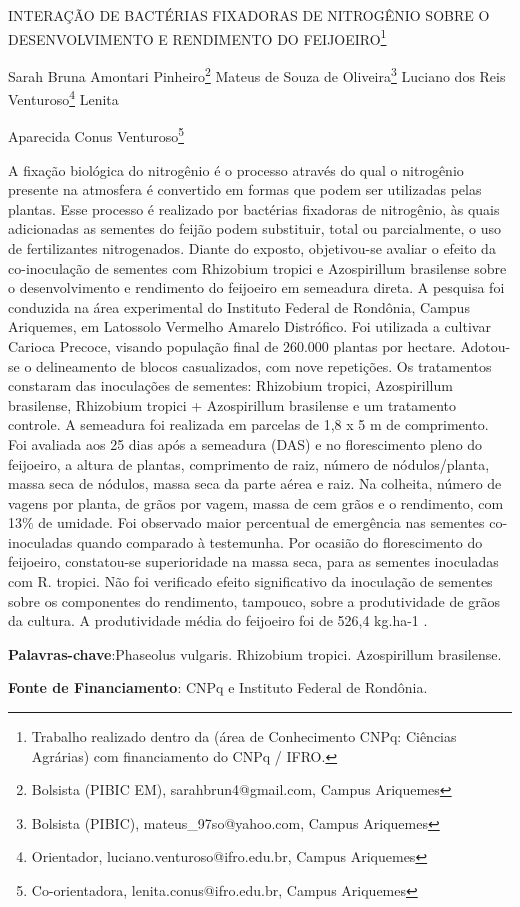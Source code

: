 \documentclass[article,12pt,onesidea,4paper,english,brazil]{abntex2}
\begin{document}
	
	
	\frenchspacing 
	
	\begin{center}
		\LARGE INTERAÇÃO DE BACTÉRIAS FIXADORAS DE NITROGÊNIO SOBRE O
		DESENVOLVIMENTO E RENDIMENTO DO FEIJOEIRO\footnote{Trabalho realizado dentro da (área de Conhecimento CNPq: Ciências Agrárias) com financiamento
			do CNPq / IFRO.}
		
		\normalsize
		Sarah Bruna Amontari Pinheiro\footnote{Bolsista (PIBIC EM), sarahbrun4@gmail.com, Campus Ariquemes} 
		Mateus de Souza de Oliveira\footnote{Bolsista (PIBIC), mateus\_97so@yahoo.com, Campus Ariquemes} 
		Luciano dos Reis Venturoso\footnote{Orientador, luciano.venturoso@ifro.edu.br, Campus Ariquemes} 
		Lenita
		
		Aparecida Conus Venturoso\footnote{Co-orientadora, lenita.conus@ifro.edu.br, Campus Ariquemes} 
	
        
    \end{center}    
	
	\noindent A fixação biológica do nitrogênio é o processo através do qual o nitrogênio presente
	na atmosfera é convertido em formas que podem ser utilizadas pelas plantas. Esse
	processo é realizado por bactérias fixadoras de nitrogênio, às quais adicionadas as
	sementes do feijão podem substituir, total ou parcialmente, o uso de fertilizantes
	nitrogenados. Diante do exposto, objetivou-se avaliar o efeito da co-inoculação de
	sementes com Rhizobium tropici e Azospirillum brasilense sobre o desenvolvimento
	e rendimento do feijoeiro em semeadura direta. A pesquisa foi conduzida na área
	experimental do Instituto Federal de Rondônia, Campus Ariquemes, em Latossolo
	Vermelho Amarelo Distrófico. Foi utilizada a cultivar Carioca Precoce, visando
	população final de 260.000 plantas por hectare. Adotou-se o delineamento de blocos
	casualizados, com nove repetições. Os tratamentos constaram das inoculações de
	sementes: Rhizobium tropici, Azospirillum brasilense, Rhizobium tropici +
	Azospirillum brasilense e um tratamento controle. A semeadura foi realizada em
	parcelas de 1,8 x 5 m de comprimento. Foi avaliada aos 25 dias após a semeadura
	(DAS) e no florescimento pleno do feijoeiro, a altura de plantas, comprimento de raiz,
	número de nódulos/planta, massa seca de nódulos, massa seca da parte aérea e
	raiz. Na colheita, número de vagens por planta, de grãos por vagem, massa de cem
	grãos e o rendimento, com 13\% de umidade. Foi observado maior percentual de
	emergência nas sementes co-inoculadas quando comparado à testemunha. Por
	ocasião do florescimento do feijoeiro, constatou-se superioridade na massa seca,
	para as sementes inoculadas com R. tropici. Não foi verificado efeito significativo da
	inoculação de sementes sobre os componentes do rendimento, tampouco, sobre a
	produtividade de grãos da cultura. A produtividade média do feijoeiro foi de 526,4
	kg.ha-1
	.
	
	\vspace{\onelineskip}
	
	\noindent
	\textbf{Palavras-chave}:Phaseolus vulgaris. Rhizobium tropici. Azospirillum brasilense.
	
	\noindent
	\textbf{Fonte de Financiamento}: CNPq e Instituto Federal de Rondônia.
	
\end{document}
